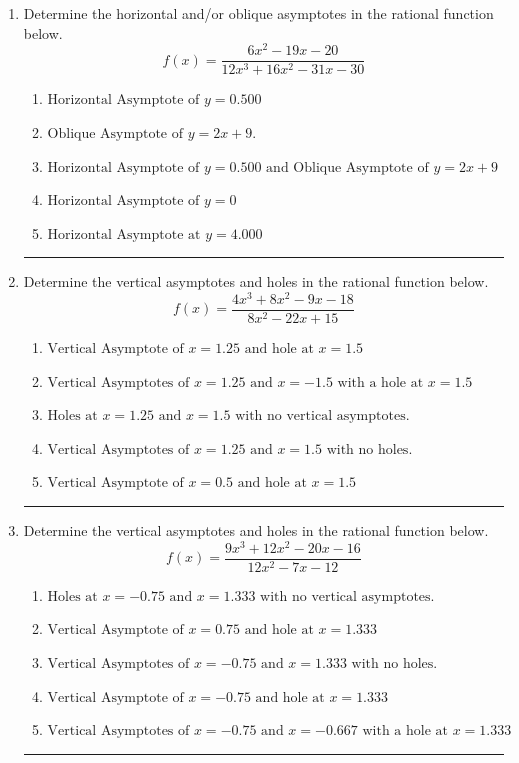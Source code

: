 \documentclass[14pt]{extbook}
\newcommand{\litem}[1]{\item#1\hspace*{-1cm}\rule{\textwidth}{0.4pt}}
\begin{document}
\begin{enumerate}
\litem{
Determine the horizontal and/or oblique asymptotes in the rational function below.\[ f(x) = \frac{6x^{2} -19 x -20}{12x^{3} +16 x^{2} -31 x -30} \]\begin{enumerate}[label=\Alph*.]
\item \( \text{Horizontal Asymptote of } y = 0.500  \)
\item \( \text{Oblique Asymptote of } y = 2x + 9. \)
\item \( \text{Horizontal Asymptote of } y = 0.500 \text{ and Oblique Asymptote of } y = 2x + 9 \)
\item \( \text{Horizontal Asymptote of } y = 0 \)
\item \( \text{Horizontal Asymptote at } y = 4.000 \)

\end{enumerate} }
\litem{
Determine the vertical asymptotes and holes in the rational function below.\[ f(x) = \frac{4x^{3} +8 x^{2} -9 x -18}{8x^{2} -22 x + 15} \]\begin{enumerate}[label=\Alph*.]
\item \( \text{Vertical Asymptote of } x = 1.25 \text{ and hole at } x = 1.5 \)
\item \( \text{Vertical Asymptotes of } x = 1.25 \text{ and } x = -1.5 \text{ with a hole at } x = 1.5 \)
\item \( \text{Holes at } x = 1.25 \text{ and } x = 1.5 \text{ with no vertical asymptotes.} \)
\item \( \text{Vertical Asymptotes of } x = 1.25 \text{ and } x = 1.5 \text{ with no holes.} \)
\item \( \text{Vertical Asymptote of } x = 0.5 \text{ and hole at } x = 1.5 \)

\end{enumerate} }
\litem{
Determine the vertical asymptotes and holes in the rational function below.\[ f(x) = \frac{9x^{3} +12 x^{2} -20 x -16}{12x^{2} -7 x -12} \]\begin{enumerate}[label=\Alph*.]
\item \( \text{Holes at } x = -0.75 \text{ and } x = 1.333 \text{ with no vertical asymptotes.} \)
\item \( \text{Vertical Asymptote of } x = 0.75 \text{ and hole at } x = 1.333 \)
\item \( \text{Vertical Asymptotes of } x = -0.75 \text{ and } x = 1.333 \text{ with no holes.} \)
\item \( \text{Vertical Asymptote of } x = -0.75 \text{ and hole at } x = 1.333 \)
\item \( \text{Vertical Asymptotes of } x = -0.75 \text{ and } x = -0.667 \text{ with a hole at } x = 1.333 \)


\end{enumerate}}
\end{enumerate}
\end{document}
